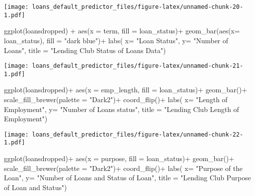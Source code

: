 \documentclass[
]{article}
\newenvironment{Shaded}{\begin{snugshade}}{\end{snugshade}}
\newcommand{\AttributeTok}[1]{\textcolor[rgb]{0.77,0.63,0.00}{#1}}
\newcommand{\FunctionTok}[1]{\textcolor[rgb]{0.00,0.00,0.00}{#1}}
\newcommand{\NormalTok}[1]{#1}
\newcommand{\SpecialCharTok}[1]{\textcolor[rgb]{0.00,0.00,0.00}{#1}}
\newcommand{\StringTok}[1]{\textcolor[rgb]{0.31,0.60,0.02}{#1}}
\begin{document}
\texttt{[image: loans\_default\_predictor\_files/figure-latex/unnamed-chunk-20-1.pdf]}

\begin{Shaded}
\begin{Highlighting}[]
\FunctionTok{ggplot}\NormalTok{(loansdropped) }\SpecialCharTok{+}
  \FunctionTok{aes}\NormalTok{(}\AttributeTok{x =}\NormalTok{ term, }\AttributeTok{fill =}\NormalTok{ loan\_status)}\SpecialCharTok{+}
  \FunctionTok{geom\_bar}\NormalTok{(}\FunctionTok{aes}\NormalTok{(}\AttributeTok{x=}\NormalTok{ loan\_status), }\AttributeTok{fill =} \StringTok{"dark blue"}\NormalTok{)}\SpecialCharTok{+}
\FunctionTok{labs}\NormalTok{( }\AttributeTok{x=} \StringTok{"Loan Status"}\NormalTok{,}
        \AttributeTok{y=} \StringTok{"Number of Loans"}\NormalTok{,}
        \AttributeTok{title =} \StringTok{"Lending Club Status of Loans Data"}\NormalTok{)}
\end{Highlighting}
\end{Shaded}

\texttt{[image: loans\_default\_predictor\_files/figure-latex/unnamed-chunk-21-1.pdf]}

\begin{Shaded}
\begin{Highlighting}[]
\FunctionTok{ggplot}\NormalTok{(loansdropped)}\SpecialCharTok{+}
  \FunctionTok{aes}\NormalTok{(}\AttributeTok{x =}\NormalTok{ emp\_length, }\AttributeTok{fill =}\NormalTok{ loan\_status)}\SpecialCharTok{+}
     \FunctionTok{geom\_bar}\NormalTok{()}\SpecialCharTok{+}
    \FunctionTok{scale\_fill\_brewer}\NormalTok{(}\AttributeTok{palette =} \StringTok{"Dark2"}\NormalTok{)}\SpecialCharTok{+}
  \FunctionTok{coord\_flip}\NormalTok{()}\SpecialCharTok{+}
\FunctionTok{labs}\NormalTok{( }\AttributeTok{x=} \StringTok{"Length of Employment"}\NormalTok{,}
        \AttributeTok{y=} \StringTok{"Number of Loans status"}\NormalTok{,}
        \AttributeTok{title =} \StringTok{"Lending Club Length of Employment"}\NormalTok{)}
\end{Highlighting}
\end{Shaded}

\texttt{[image: loans\_default\_predictor\_files/figure-latex/unnamed-chunk-22-1.pdf]}

\begin{Shaded}
\begin{Highlighting}[]
\FunctionTok{ggplot}\NormalTok{(loansdropped)}\SpecialCharTok{+}
  \FunctionTok{aes}\NormalTok{(}\AttributeTok{x =}\NormalTok{ purpose, }\AttributeTok{fill =}\NormalTok{ loan\_status)}\SpecialCharTok{+}
     \FunctionTok{geom\_bar}\NormalTok{()}\SpecialCharTok{+}
    \FunctionTok{scale\_fill\_brewer}\NormalTok{(}\AttributeTok{palette =} \StringTok{"Dark2"}\NormalTok{)}\SpecialCharTok{+}
  \FunctionTok{coord\_flip}\NormalTok{()}\SpecialCharTok{+}
\FunctionTok{labs}\NormalTok{( }\AttributeTok{x=} \StringTok{"Purpose of the Loan"}\NormalTok{,}
        \AttributeTok{y=} \StringTok{"Number of Loans  and Status of Loan"}\NormalTok{,}
        \AttributeTok{title =} \StringTok{"Lending Club Purpose of Loan and Status"}\NormalTok{)}
\end{Highlighting}
\end{Shaded}
\end{document}
